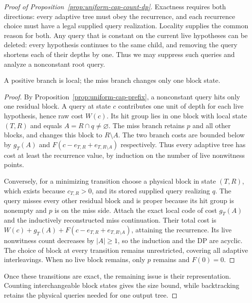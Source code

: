 \begin{proof}[Proof of Proposition~\ref{prop:uniform-cap-count-dp}]
Exactness requires both directions: every adaptive tree must obey
the recurrence, and each recurrence choice must have a legal supplied
query realization. Locality supplies the common reason for both.
Any query that is constant on the current live hypotheses can be
deleted: every hypothesis continues to the same child, and removing
the query shortens each of their depths by one. Thus we may suppress
such queries and analyze a nonconstant root query.

\begin{claim}
\label{clm:uniform-cap-transition}
A positive branch is local; the miss branch changes only one block state.
\end{claim}
\begin{proof}
By Proposition~\ref{prop:uniform-cap-prefix}, a nonconstant query
hits only one residual block. A query at state $c$ contributes one unit of depth for each live
hypothesis, hence raw cost $W(c)$. Its hit group lies in one block
with local state $(T,R)$ and equals $A=R\cap q\ne\varnothing$.
The miss branch retains $p$ and all other blocks, and changes this
block to $R\setminus A$. The two branch costs are bounded below
by $g_T(A)$ and $F(c-e_{T,R}+e_{T,R\setminus A})$ respectively.
Thus every adaptive tree has cost at least the recurrence value,
by induction on the number of live nonwitness points.

Conversely, for a minimizing transition choose a physical block in
state $(T,R)$, which exists because $c_{T,R}>0$, and its stored
supplied query realizing $q$. The query misses every other residual
block and is proper because its hit group is nonempty and $p$ is
on the miss side. Attach the exact local code of cost $g_T(A)$ and
the inductively reconstructed miss continuation. Their total cost is
$W(c)+g_T(A)+F(c-e_{T,R}+e_{T,R\setminus A})$, attaining the
recurrence. Its live nonwitness count decreases by $|A|\ge1$,
so the induction and the DP are acyclic. The choice of block at every
transition remains unrestricted, covering all adaptive interleavings.
When no live block remains, only $p$ remains and $F(0)=0$.

\end{proof}
Once these transitions are exact, the remaining issue is their
representation. Counting interchangeable block states gives the size
bound, while backtracking retains the physical queries needed for
one output tree.


\end{proof}
